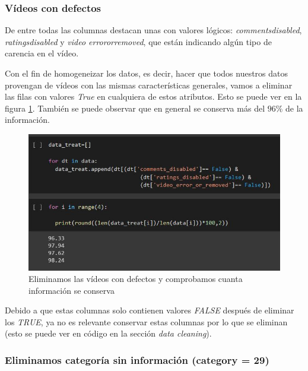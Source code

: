 \documentclass[a4paper,12pt]{article}
\begin{document}
\subsubsection{V\'ideos con defectos}

De entre todas las columnas destacan unas con valores l\'ogicos:  {\itshape comments{\textunderscore}disabled}, {\itshape ratings{\textunderscore}disabled} y {\itshape video {\textunderscore}error{\textunderscore}or{\textunderscore}removed}, que est\'an  indicando alg\'un tipo de carencia en el v\'ideo. 

Con el fin de homogeneizar los datos, es decir, hacer que todos nuestros datos provengan de v\'ideos con las mismas caracter\'isticas generales, vamos a eliminar las filas con valores {\itshape True} en cualquiera de estos atributos. Esto se puede ver en la figura \ref{fig:defect}. Tambi\'en se puede observar que en general se conserva m\'as del $96\%$ de la informaci\'on. 


\begin{figure}[h!]
\centering
\includegraphics[width=13cm]{data_selection_2.JPG}
\caption{Eliminamos las v\'ideos con defectos y comprobamos cuanta informaci\'on se conserva}
\label{fig:defect}
\end{figure}




Debido a que estas columnas solo contienen valores {\itshape FALSE} despu\'es de eliminar los {\itshape TRUE}, ya no es relevante conservar estas columnas por lo que se eliminan (esto se puede ver en c\'odigo en la secci\'on {\itshape data cleaning}).

\subsubsection{Eliminamos categor\'ia sin informaci\'on (category = 29)}
\end{document}
